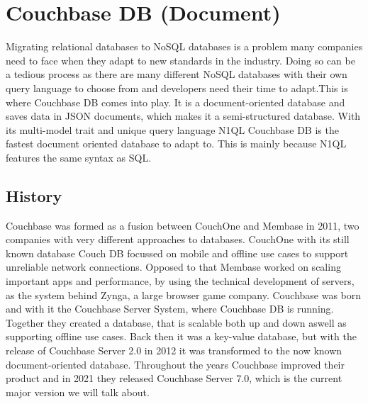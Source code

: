
\chapter{Couchbase DB (Document)} \label{ch:couchbase}

Migrating relational databases to \ac{NoSQL} databases is a problem many companies need to face when they adapt to new standards in the industry. Doing so can be a tedious process as there are many different \ac{NoSQL} databases with their own query language to choose from and developers need their time to adapt.\newline This is where Couchbase DB comes into play. It is a document-oriented database and saves data in \ac{JSON} documents, which makes it a semi-structured database. With its multi-model trait and unique query language \ac{N1QL} Couchbase DB is the fastest document oriented database to adapt to. This is mainly because \ac{N1QL} features the same syntax as \ac{SQL}. \parencite{BigdataInsiderOnCouchbase}

\section{History}
Couchbase was formed as a fusion between CouchOne and Membase in 2011, two companies with very different approaches to databases. CouchOne with its still known database Couch DB focussed on mobile and offline use cases to support unreliable network connections. Opposed to that Membase worked on scaling important apps and performance, by using the technical development of servers, as the system behind Zynga, a large browser game company. Couchbase was born and with it the Couchbase Server System, where Couchbase DB is running. Together they created a database, that is scalable both up and down aswell as supporting offline use cases.  \parencite{CouchOne-Membase-Fusion}\newline
Back then it was a key-value database, but with the release of Couchbase Server 2.0 in 2012 it was transformed to the now known document-oriented database. Throughout the years Couchbase improved their product and in 2021 they released Couchbase Server 7.0, which is the current major version we will talk about. \parencite{CouchbaseAbout}

